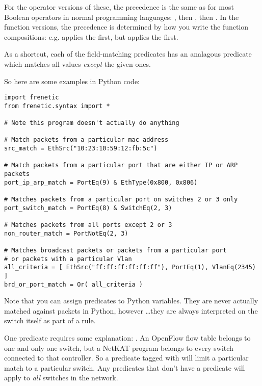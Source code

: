 \bigskip

For the operator versions of these, the precedence is the same as for most Boolean operators in normal 
programming languages: 
, then , then .  
In the function versions, the precedence is determined by how you write the function compositions:
e.g.  applies the  first, but  applies the  first.

As a shortcut, each of the field-matching predicates  has an analagous 
predicate which matches all values \emph{except} the given ones.  

So here are some examples in Python code:

\begin{verbatim}
import frenetic
from frenetic.syntax import *

# Note this program doesn't actually do anything

# Match packets from a particular mac address
src_match = EthSrc("10:23:10:59:12:fb:5c")

# Match packets from a particular port that are either IP or ARP packets
port_ip_arp_match = PortEq(9) & EthType(0x800, 0x806)

# Matches packets from a particular port on switches 2 or 3 only
port_switch_match = PortEq(8) & SwitchEq(2, 3)

# Matches packets from all ports except 2 or 3
non_router_match = PortNotEq(2, 3)

# Matches broadcast packets or packets from a particular port 
# or packets with a particular Vlan
all_criteria = [ EthSrc("ff:ff:ff:ff:ff:ff"), PortEq(1), VlanEq(2345) ] 
brd_or_port_match = Or( all_criteria ) 

\end{verbatim}

Note that you can assign predicates to Python variables.  They are never actually matched against packets
in Python, however \ldots they are always interpreted on the switch itself as part of a rule.

One predicate requires some explanation: .  
An OpenFlow flow table belongs to one and only one switch, but a NetKAT program belongs to every
switch connected to that controller.  
So a predicate tagged with  will limit a particular match to a particular switch.
Any predicates that don't have a  predicate will apply to \textit{all} switches in the network.

